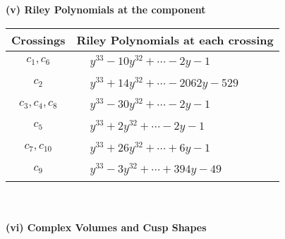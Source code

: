 \documentclass[1p]{elsarticle_modified}
\theoremstyle{definition}
\begin{document}
\newpage\renewcommand{\arraystretch}{1}
\flushleft \textbf{(v) Riley Polynomials at the component}\newline \\
\begin{tabular}{m{50pt}|m{274pt}}
Crossings & \hspace{64pt}Riley Polynomials at each crossing \\
\hline $$\begin{aligned}c_{1},c_{6}\end{aligned}$$&$\begin{aligned}
&y^{33}-10 y^{32}+\cdots-2 y-1
\end{aligned}$\\
\hline $$\begin{aligned}c_{2}\end{aligned}$$&$\begin{aligned}
&y^{33}+14 y^{32}+\cdots-2062 y-529
\end{aligned}$\\
\hline $$\begin{aligned}c_{3},c_{4},c_{8}\end{aligned}$$&$\begin{aligned}
&y^{33}-30 y^{32}+\cdots-2 y-1
\end{aligned}$\\
\hline $$\begin{aligned}c_{5}\end{aligned}$$&$\begin{aligned}
&y^{33}+2 y^{32}+\cdots-2 y-1
\end{aligned}$\\
\hline $$\begin{aligned}c_{7},c_{10}\end{aligned}$$&$\begin{aligned}
&y^{33}+26 y^{32}+\cdots+6 y-1
\end{aligned}$\\
\hline $$\begin{aligned}c_{9}\end{aligned}$$&$\begin{aligned}
&y^{33}-3 y^{32}+\cdots+394 y-49
\end{aligned}$\\
\hline
\end{tabular}\\~\\
\newpage\flushleft \textbf{(vi) Complex Volumes and Cusp Shapes}
\end{document}
